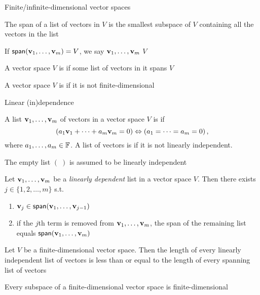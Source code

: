 \documentclass[aspectratio=169]{beamer}
\begin{document}
\begin{frame}{Finite/infinite-dimensional vector spaces}
\begin{theorem}
The span of a list of vectors in $V$ is the smallest subspace of $V$ containing all the vectors in the list
\end{theorem}
\begin{definition}
If $\mathsf{span}(\mathbf{v}_1,\ldots,\mathbf{v}_m)=V$, we say $\mathbf{v}_1,\ldots,\mathbf{v}_m$  $V$
\end{definition}
\begin{definition}
A vector space $V$ is  if some list of vectors in it spans $V$
\end{definition}
\begin{definition}
A vector space $V$ is  if it is not finite-dimensional
\end{definition}
\end{frame}


\begin{frame}{Linear (in)dependence}
\begin{definition}
A list $\mathbf{v}_1,\ldots,\mathbf{v}_m$ of vectors in a vector space $V$ is  if
\[
\left(a_1\mathbf{v}_1+\cdots+a_m\mathbf{v}_m=0\right)
\Leftrightarrow
\left(a_1=\cdots=a_m=0\right),
\]
where $a_1,\ldots,a_m\in\mathbb{F}$. 
A list of vectors is  if it is not linearly independent.
\end{definition}
The empty list $(\;)$ is assumed to be linearly independent
\end{frame}


\begin{frame}
\begin{lemma}
Let $\mathbf{v}_1,\ldots,\mathbf{v}_m$ be a \emph{linearly dependent} list in a vector space $V$. Then there exists $j\in\{1,2,\ldots,m\}$ s.t.
\begin{enumerate}
\item $\mathbf{v}_j\in\mathsf{span}(\mathbf{v}_1,\ldots,\mathbf{v}_{j-1})$
\item if the $j$th term is removed from $\mathbf{v}_1,\ldots,\mathbf{v}_m$, the span of the remaining list equals $\mathsf{span}(\mathbf{v}_1,\ldots,\mathbf{v}_m)$
\end{enumerate}
\end{lemma}
\begin{importanttheorem}
Let $V$ be a finite-dimensional vector space. Then the length of every linearly independent list of vectors is less than or equal to the length of every spanning list of vectors
\end{importanttheorem}
\begin{importanttheorem}
Every subspace of a finite-dimensional vector space is finite-dimensional
\end{importanttheorem}
\end{frame}
\end{document}
